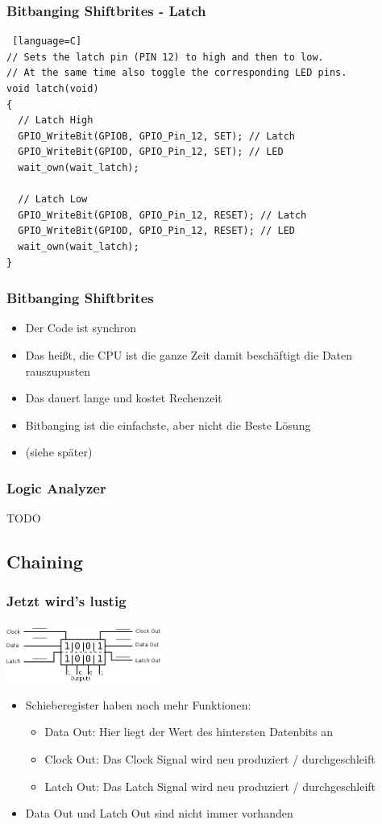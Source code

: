 \documentclass[ngerman,compress]{beamer}
\begin{document}
\begin{frame} [fragile]
	\frametitle{Bitbanging Shiftbrites - Latch}
	\begin{lstlisting} [language=C]
// Sets the latch pin (PIN 12) to high and then to low.
// At the same time also toggle the corresponding LED pins.
void latch(void)
{
  // Latch High
  GPIO_WriteBit(GPIOB, GPIO_Pin_12, SET); // Latch
  GPIO_WriteBit(GPIOD, GPIO_Pin_12, SET); // LED
  wait_own(wait_latch);

  // Latch Low
  GPIO_WriteBit(GPIOB, GPIO_Pin_12, RESET); // Latch
  GPIO_WriteBit(GPIOD, GPIO_Pin_12, RESET); // LED
  wait_own(wait_latch);
}
	\end{lstlisting}
\end{frame}

\begin{frame} [fragile]
	\frametitle{Bitbanging Shiftbrites}
	\begin{itemize}
		\item Der Code ist synchron
		\item Das heißt, die CPU ist die ganze Zeit damit beschäftigt die Daten rauszupusten
		\item Das dauert lange und kostet Rechenzeit
		\item Bitbanging ist die einfachste, aber nicht die Beste Lösung
		\item (siehe später)
	\end{itemize}
\end{frame}

\begin{frame} [fragile]
	\frametitle{Logic Analyzer}
	TODO
\end{frame}


\subsection{Chaining}

\begin{frame} [fragile]
	\frametitle{Jetzt wird's lustig}
	\includegraphics[width=2in]{08_outs.png}
	\pause
	\begin{itemize}
		\item Schieberegister haben noch mehr Funktionen:
		\begin{itemize}
			\item Data Out: Hier liegt der Wert des hintersten Datenbits an
			\item Clock Out: Das Clock Signal wird neu produziert / durchgeschleift
			\item Latch Out: Das Latch Signal wird neu produziert / durchgeschleift
		\end{itemize}
		\pause
		\item Data Out und Latch Out sind nicht immer vorhanden
	\end{itemize}
\end{frame}
\end{document}
